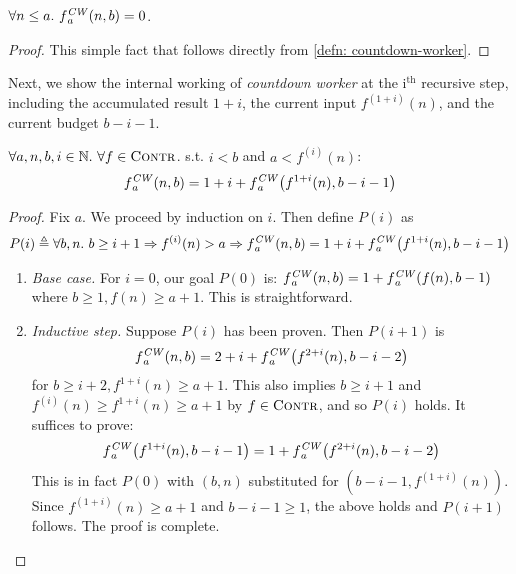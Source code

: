 \begin{lem} \label{lem: cdt-init}
	$\forall n\le a.~\cdw{f}{a} (n, b) = 0$.
\end{lem}
\begin{proof}
This simple fact that follows directly from \cref{defn: countdown-worker}.
\end{proof}
Next, we show the internal working of \emph{countdown worker} at the $\text{i}^\text{th}$ recursive step, including the accumulated result $1+i$, the current input $f^{(1+i)}(n)$, and the current budget $b-i-1$.
\begin{lem} \label{lem: cdt-intermediate}
	$\forall a, n, b, i \in \mathbb{N}.~\forall f \in \text{\scshape{Contr}}$. s.t. $i < b$ and $a < f^{(i)}(n)$:~
	\begin{equation}  \label{eq: cdt-intermediate}
	\cdw{f}{a}(n, b) = 1 + i + \cdw{f}{a}\left(f^{1+i}(n), b - i - 1\right)
	\end{equation}
\end{lem}
\begin{proof}
	Fix $a$. We proceed by induction on $i$. Then define $P(i)$ as
	\begin{equation*}
	P(i) \triangleq \forall b, n.~ b\ge i+1 \Rightarrow f^{(i)}(n) > a \Rightarrow \cdw{f}{a}(n, b) = 1 + i + \cdw{f}{a}\left(f^{1+i}(n), b - i - 1\right)
	\end{equation*}
	\begin{enumerate}[leftmargin=*]
		\item \textit{Base case.} For $i = 0$, our goal $P(0)$ is:
		$\cdw{f}{a}(n, b) = 1 + \cdw{f}{a}\left(f(n), b - 1\right)$
		where $b \ge 1, f(n)\ge a+1$. This is straightforward.
		\item \textit{Inductive step.} Suppose $P(i)$ has been proven. Then $P(i+1)$ is
		\begin{equation*}
		\cdw{f}{a}(n, b) = 2 + i + \cdw{f}{a}\left( f^{2+i}(n), b - i - 2 \right)
		\end{equation*}
		for $b \ge i+2, f^{1+i}(n) \ge a+1$. This also implies $b\ge i+1$ and $\displaystyle f^{(i)}(n) \ge f^{1+i}(n)\ge a+1$ by $f\in \text{\scshape{Contr}}$, and so $P(i)$ holds. It suffices to prove:
		\begin{equation*}
		\cdw{f}{a}\left(f^{1+i}(n), b-i-1\right) = 1 + \cdw{f}{a}\left( f^{2+i}(n), b-i-2 \right)
		\end{equation*}
		This is in fact $P(0)$ with $(b, n)$ substituted for $\left(b-i-1, f^{(1+i)}(n)\right)$. Since $f^{(1+i)}(n) \ge a+1$ and $b-i-1\ge 1$, the above holds and $P(i+1)$ follows. The proof is complete. \vspace*{-2.2em}
	\end{enumerate}
\end{proof}
